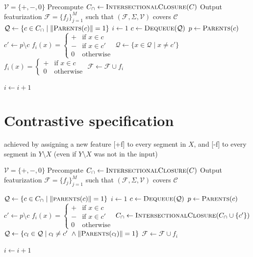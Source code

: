 \documentclass[11pt, oneside]{article}   	%
\begin{document}
\vspace{\baselineskip} \noindent \begin{algorithmic}
	\REQUIRE $\mathcal V = \{ +, -, 0 \}$
	\REQUIRE Precompute $C_\cap \leftarrow \textsc{IntersectionalClosure}(C)$
	\ENSURE Output featurization $\mathcal F = \{ f_j \}_{j=1}^M$ such that $(\mathcal F, \Sigma, \mathcal V)$ covers $\mathcal C$
	\STATE
	\STATE $\mathcal Q \leftarrow \{c \in C_\cap \mid \Vert\textsc{Parents}(c)\Vert = 1 \}$
	\STATE $i \leftarrow 1$
	\STATE
	\STATE $c \leftarrow \textsc{Dequeue}(\mathcal Q)$
	\STATE $p \leftarrow \textsc{Parents}(c)$
	\STATE $c' \leftarrow p \setminus c$
	\STATE $f_i(x) = \begin{cases}
	+ & \mbox{if } x \in c \\
	- & \mbox{if } x \in c' \\
	0 & \mbox{otherwise}
	\end{cases} $
	\STATE $\mathcal Q \leftarrow \{x \in \mathcal Q \mid x \not= c' \}$
	\ELSE
	\STATE $f_i(x) = \begin{cases}
	+ & \mbox{if } x \in c \\
	0 & \mbox{otherwise}
	\end{cases} $
	\ENDIF
	\STATE $\mathcal F \leftarrow \mathcal F \cup f_i$
	
	\STATE $i \leftarrow i + 1$
	\ENDWHILE
\end{algorithmic}

\section{Contrastive specification}
achieved by assigning a new feature [+f] to every segment in $X$, and [-f] to every segment in $Y \setminus X$ (even if $Y \setminus X$ was not in the input)

\vspace{\baselineskip} \noindent \begin{algorithmic}
	\REQUIRE $\mathcal V = \{ +, -, 0 \}$
	\REQUIRE Precompute $C_\cap \leftarrow \textsc{IntersectionalClosure}(C)$
	\ENSURE Output featurization $\mathcal F = \{ f_j \}_{j=1}^M$ such that $(\mathcal F, \Sigma, \mathcal V)$ covers $\mathcal C$
	
	\STATE
	\STATE $\mathcal Q \leftarrow \{c \in C_\cap \mid \Vert\textsc{parents}(c)\Vert = 1 \}$
	\STATE $i \leftarrow 1$
	\STATE
	\STATE $c \leftarrow \textsc{Dequeue}(\mathcal Q)$
	\STATE $p \leftarrow \textsc{Parents}(c)$
	\STATE $c' \leftarrow p \setminus c$
	\STATE $f_i(x) = \begin{cases}
	+ & \mbox{if } x \in c \\
	- & \mbox{if } x \in c' \\
	0 & \mbox{otherwise}
	\end{cases} $
	\STATE $C_\cap \leftarrow \textsc{IntersectionalClosure}(C_\cap \cup \{c'\})$
	\STATE $\mathcal Q \leftarrow \{c_l \in \mathcal Q \mid c_l \not= c' \ \land \Vert \textsc{Parents}(c_l) \Vert = 1 \}$
	\STATE $\mathcal F \leftarrow \mathcal F \cup f_i$
	
	\STATE $i \leftarrow i + 1$
	\ENDWHILE
\end{algorithmic}
\end{document}
